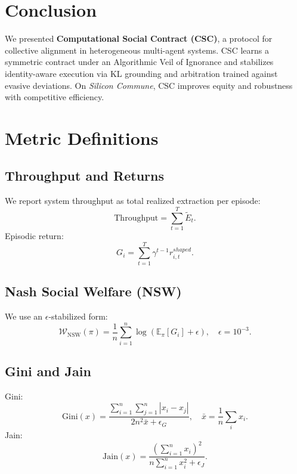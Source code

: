 \documentclass{article}
\theoremstyle{definition}
\theoremstyle{plain}
\theoremstyle{remark}
\newcommand{\NSW}{\mathcal{W}_{\mathrm{NSW}}}
\newcommand{\E}{\mathbb{E}}
\begin{document}
\section{Conclusion}
\label{sec:conclusion}

We presented \textbf{Computational Social Contract (CSC)}, a protocol for collective alignment in heterogeneous multi-agent systems.
CSC learns a symmetric contract under an Algorithmic Veil of Ignorance and stabilizes identity-aware execution via KL grounding and arbitration trained against evasive deviations.
On \textit{Silicon Commune}, CSC improves equity and robustness with competitive efficiency.




\appendix

\section{Metric Definitions}
\label{app:metrics}

\subsection{Throughput and Returns}
We report system throughput as total realized extraction per episode:
\[
\mathrm{Throughput}=\sum_{t=1}^T \tilde{E}_t.
\]
Episodic return:
\[
G_i=\sum_{t=1}^T \gamma^{t-1} r^{shaped}_{i,t}.
\]

\subsection{Nash Social Welfare (NSW)}
We use an $\epsilon$-stabilized form:
\[
\NSW(\pi)=\frac{1}{n}\sum_{i=1}^n \log\left(\E_\pi[G_i]+\epsilon\right),
\quad \epsilon=10^{-3}.
\]

\subsection{Gini and Jain}
Gini:
\[
\mathrm{Gini}(x)=\frac{\sum_{i=1}^n\sum_{j=1}^n |x_i-x_j|}{2n^2 \bar{x}+\epsilon_G},
\quad \bar{x}=\frac{1}{n}\sum_i x_i.
\]
Jain:
\[
\mathrm{Jain}(x)=\frac{(\sum_{i=1}^n x_i)^2}{n\sum_{i=1}^n x_i^2+\epsilon_J}.
\]
\end{document}
